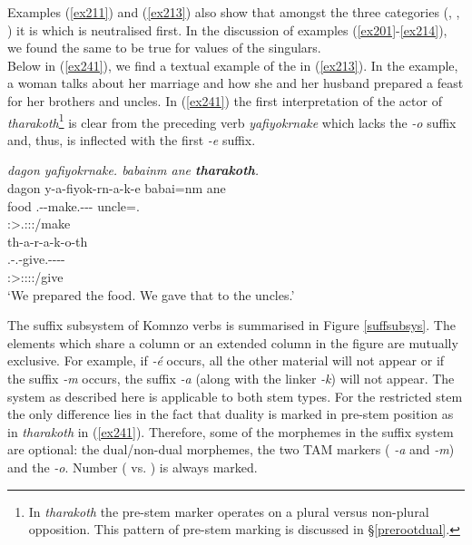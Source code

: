 Examples (\ref{ex211}) and (\ref{ex213}) also show that amongst the three categories (, , ) it is  which is neutralised first. In the discussion of examples (\ref{ex201}-\ref{ex214}), we found the same to be true for  values of the singulars.\\

Below in (\ref{ex241}), we find a textual example of the   in (\ref{ex213}). In the example, a woman talks about her marriage and how she and her husband prepared a feast for her brothers and uncles. In (\ref{ex241}) the first  interpretation of the actor of \emph{tharakoth}\footnote{In \emph{tharakoth} the pre-stem marker operates on a plural versus non-plural opposition. This pattern of pre-stem marking is discussed in \S{}\ref{prerootdual}.} is clear from the preceding verb \emph{yafiyokrnake} which lacks the  \emph{-o} suffix and, thus, is inflected with the first  \emph{-e} suffix.

\begin{exe}
	\ex \emph{dagon yafiyokrnake. babainm ane \textbf{tharakoth}.}\\
	\glll dagon y-a-fiyok-rn-a-k-e babai=nm ane\\
	food \Tsg.\Masc-\Vc-make.\Ext-\Pst-\Lk-\Fnsg{} uncle=\Dat.\Nsg{} \Dem{}\\
	{} \footnotesize{\Fdu:\Sbj>\Tsg.\Masc:\Obj:\Pst:\Ipfv/make} {} {}\\
	\sn
	\glll th-a-r-a-k-o-th\\
	\Stnsg.\Gam-\Vc.\Du-give.\Rs-\Pst-\Lk-\Andat-\Nsg\\
	\footnotesize{\Fdu:\Sbj>\Stpl:\Io:\Pst:\Pfv:\Andat/give}\\
	\trans `We prepared the food. We gave that to the uncles.'
	\label{ex241}
\end{exe}

The suffix subsystem of Komnzo verbs is summarised in Figure \ref{suffsubsys}. The elements which share a column or an extended column in the figure are mutually exclusive. For example, if \emph{-é} occurs, all the other material will not appear or if the  suffix \emph{-m} occurs, the  suffix \emph{-a} (along with the linker \emph{-k}) will not appear. The system as described here is applicable to both stem types. For the restricted stem the only difference lies in the fact that duality is marked in pre-stem position as in \emph{tharakoth} in (\ref{ex241}). Therefore, some of the morphemes in the suffix system are optional: the dual/non-dual morphemes, the two TAM markers (\Pst{} \emph{-a} and \Dur{} \emph{-m}) and the  \emph{-o}. Number (\Sg{} vs. \Nsg) is always marked.

